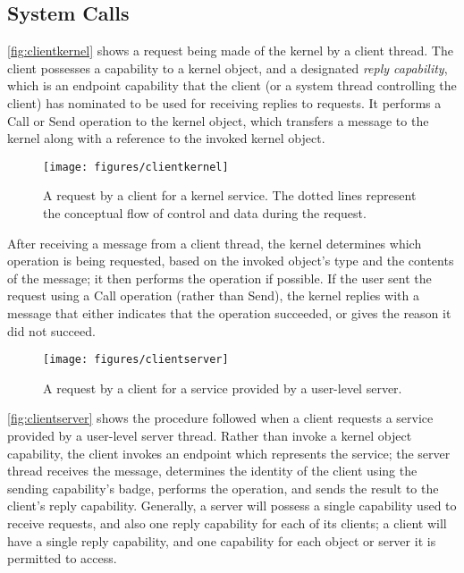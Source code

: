 \subsection{System Calls}

\autoref{fig:clientkernel} shows a request being made of the kernel by a
client thread. The client possesses a capability to a kernel object, and a
designated \emph{reply capability}, which is an endpoint capability that the
client (or a system thread controlling the client) has nominated to be used
for receiving replies to requests. It performs a Call or Send operation to the kernel
object, which transfers a message to the kernel along with a reference to the
invoked kernel object.

\begin{figure}
\centering \texttt{[image: figures/clientkernel]}
\caption{A request by a client for a kernel service. The dotted lines
represent the conceptual flow of control and data during the
request.}
\label{fig:clientkernel}
\end{figure}

After receiving a message from a client thread, the kernel determines which
operation is being requested, based on the invoked object's type and the
contents of the message; it then performs the operation if possible. If the user sent the request using a Call operation (rather than Send), the kernel replies with a message that either indicates that the operation succeeded, or gives the reason it did not succeed.

\begin{figure}
\centering \texttt{[image: figures/clientserver]}
\caption{A request by a client for a service provided by a user-level server.}
\label{fig:clientserver}
\end{figure}

\autoref{fig:clientserver} shows the procedure followed when a client
requests a service provided by a user-level server thread. Rather than invoke
a kernel object capability, the client invokes an endpoint which represents
the service; the server thread receives the message, determines the identity
of the client using the sending capability's badge, performs the operation,
and sends the result to the client's reply capability. Generally, a server
will possess a single capability used to receive requests, and also one reply
capability for each of its clients; a client will have a single reply
capability, and one capability for each object or server it is permitted to
access.

